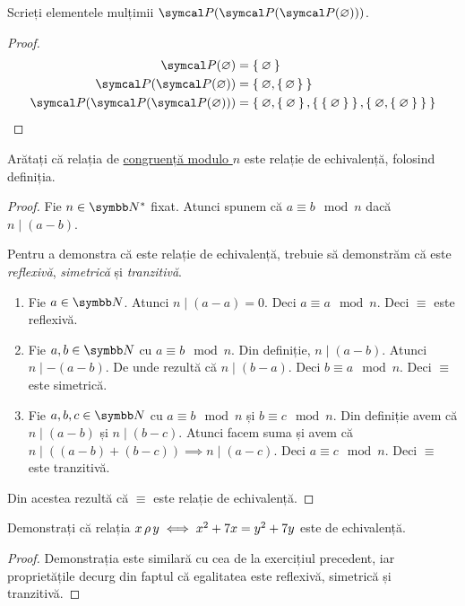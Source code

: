 \begin{exercise}
Scrieți elementele mulțimii \(\powerset(\powerset(\powerset(\varnothing)))\).
\end{exercise}

\begin{proof}
\begin{align*}
    \powerset(\varnothing) &= \Set{ \varnothing } \\
    \powerset(\powerset(\varnothing)) &= \Set{ \varnothing, \set{ \varnothing } } \\
    \powerset(\powerset(\powerset(\varnothing))) &= \Set{ \varnothing, \Set{ \varnothing }, \Set{\Set{\varnothing}}, \Set{ \varnothing, \Set{ \varnothing } } }
\end{align*}
\end{proof}

\begin{exercise}
Arătați că relația de \href{https://en.wikipedia.org/wiki/Modular_arithmetic#Definition_of_congruence_relation}{congruență modulo \(n\)} este relație de echivalență, folosind definiția.
\end{exercise}
\begin{proof}
Fie \(n \in \naturals^*\) fixat. Atunci spunem că \(a \equiv b \mod n\) dacă \(n \mid (a - b)\).

Pentru a demonstra că este relație de echivalență, trebuie să demonstrăm că este \emph{reflexivă}, \emph{simetrică} și \emph{tranzitivă}.

\begin{enumerate}
    \item Fie \(a \in \naturals\). Atunci \(n \mid (a - a) = 0\). Deci \(a \equiv a \mod n\). Deci \(\equiv\) este reflexivă.
    \item Fie \(a, b \in \naturals\) cu \(a \equiv b \mod n\). Din definiție, \(n \mid (a - b)\). Atunci \(n \mid - (a - b)\). De unde rezultă că \(n \mid (b - a)\). Deci \(b \equiv a \mod n\). Deci \(\equiv\) este simetrică.
    \item Fie \(a, b, c \in \naturals\) cu \(a \equiv b \mod n\) și \(b \equiv c \mod n\). Din definiție avem că \(n \mid (a - b)\) și \(n \mid (b - c)\). Atunci facem suma și avem că \(n \mid ((a - b) + (b - c)) \implies n \mid (a - c)\). Deci \(a \equiv c \mod n\). Deci \(\equiv\) este tranzitivă.
\end{enumerate}
Din acestea rezultă că \(\equiv\) este relație de echivalență.
\end{proof}

\begin{exercise}
Demonstrați că relația \(x \operatorname{\rho} y \iff x^2 + 7x = y^2 + 7y\) este de echivalență.
\end{exercise}
\begin{proof}
Demonstrația este similară cu cea de la exercițiul precedent, iar proprietățile decurg din faptul că egalitatea este reflexivă, simetrică și tranzitivă.
\end{proof}

